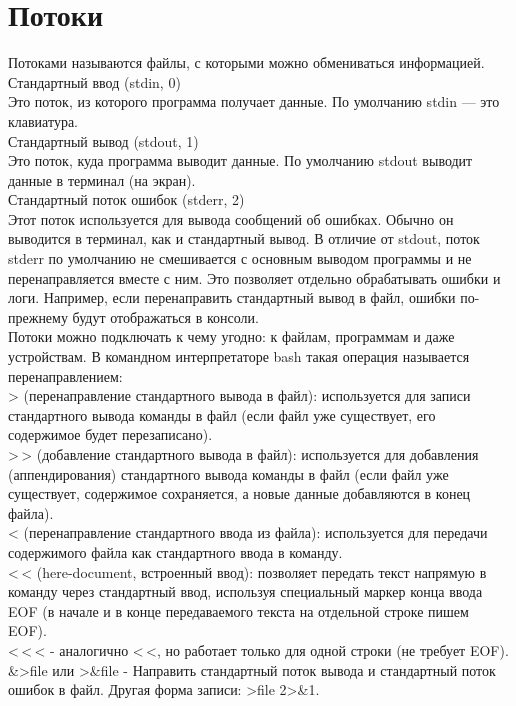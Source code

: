 \section{Потоки}
Потоками называются файлы, с которыми можно обмениваться информацией. \\
Стандартный ввод (stdin, 0) \\
Это поток, из которого программа получает данные. По умолчанию stdin — это клавиатура. \\
Стандартный вывод (stdout, 1) \\
Это поток, куда программа выводит данные. По умолчанию stdout выводит данные в терминал (на экран). \\
Стандартный поток ошибок (stderr, 2) \\
Этот поток используется для вывода сообщений об ошибках. Обычно он выводится в терминал, как и стандартный вывод. В отличие от stdout, поток stderr по умолчанию не смешивается с основным выводом программы и не перенаправляется вместе с ним. Это позволяет отдельно обрабатывать ошибки и логи. Например, если перенаправить стандартный вывод в файл, ошибки по-прежнему будут отображаться в консоли. \\
Потоки можно подключать к чему угодно: к файлам, программам и даже устройствам. В командном интерпретаторе bash такая операция называется перенаправлением: \\
> (перенаправление стандартного вывода в файл): используется для записи стандартного вывода команды в файл (если файл уже существует, его содержимое будет перезаписано). \\
>\,> (добавление стандартного вывода в файл):
используется для добавления (аппендирования) стандартного вывода команды в файл (если файл уже существует, содержимое сохраняется, а новые данные добавляются в конец файла). \\
< (перенаправление стандартного ввода из файла): используется для передачи содержимого файла как стандартного ввода в команду. \\
<\,< (here-document, встроенный ввод): позволяет передать текст напрямую в команду через стандартный ввод, используя специальный маркер конца ввода EOF (в начале и в конце передаваемого текста на отдельной строке пишем EOF). \\
<\,<\,< - аналогично <\,<, но работает только для одной строки (не требует EOF). \\ %
\&>file или >\&file - Направить стандартный поток вывода и стандартный поток ошибок в файл. Другая форма записи: >file 2>\&1. \\
